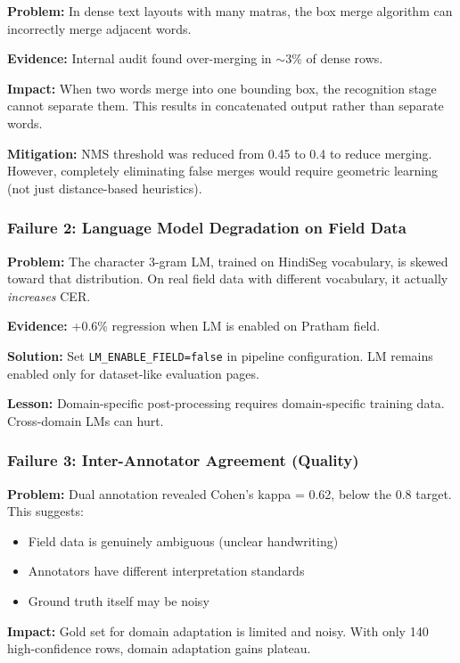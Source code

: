 \documentclass[14pt,a4paper]{article}
\begin{document}
\textbf{Problem:} In dense text layouts with many matras, the box merge algorithm can incorrectly merge adjacent words.

\textbf{Evidence:} Internal audit found over-merging in $\sim$3\% of dense rows.

\textbf{Impact:} When two words merge into one bounding box, the recognition stage cannot separate them. This results in concatenated output rather than separate words.

\textbf{Mitigation:} NMS threshold was reduced from 0.45 to 0.4 to reduce merging. However, completely eliminating false merges would require geometric learning (not just distance-based heuristics).

\subsubsection{Failure 2: Language Model Degradation on Field Data}

\textbf{Problem:} The character 3-gram LM, trained on HindiSeg vocabulary, is skewed toward that distribution. On real field data with different vocabulary, it actually \textit{increases} CER.

\textbf{Evidence:} +0.6\% regression when LM is enabled on Pratham field.

\textbf{Solution:} Set \texttt{LM\_ENABLE\_FIELD=false} in pipeline configuration. LM remains enabled only for dataset-like evaluation pages.

\textbf{Lesson:} Domain-specific post-processing requires domain-specific training data. Cross-domain LMs can hurt.

\subsubsection{Failure 3: Inter-Annotator Agreement (Quality)}

\textbf{Problem:} Dual annotation revealed Cohen's kappa = 0.62, below the 0.8 target. This suggests:
\begin{itemize}
    \item Field data is genuinely ambiguous (unclear handwriting)
    \item Annotators have different interpretation standards
    \item Ground truth itself may be noisy
\end{itemize}

\textbf{Impact:} Gold set for domain adaptation is limited and noisy. With only 140 high-confidence rows, domain adaptation gains plateau.
\end{document}
